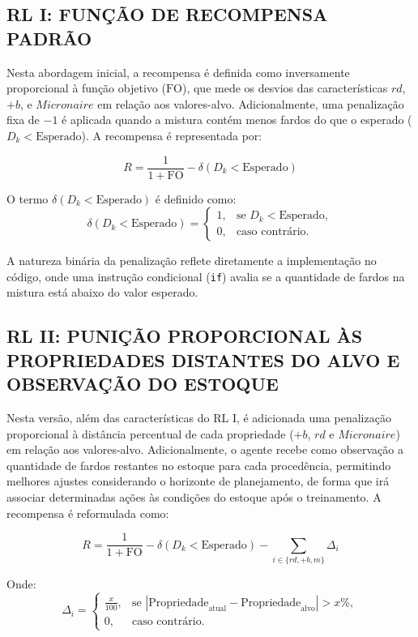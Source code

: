 \documentclass[
    12pt,                %
    openright,           %
    oneside,             %
    a4paper,             %
    english,             %
    spanish,             %
    brazil               %
]{ufscar}
\begin{document}
\subsection{RL I: FUNÇÃO DE RECOMPENSA PADRÃO}

Nesta abordagem inicial, a recompensa é definida como inversamente proporcional à função objetivo (\( \text{FO} \)), que mede os desvios das características \(rd\), \(+b\), e \(Micronaire\) em relação aos valores-alvo. Adicionalmente, uma penalização fixa de \(-1\) é aplicada quando a mistura contém menos fardos do que o esperado (\(D_k < \text{Esperado}\)). A recompensa é representada por:

\begin{equation}
R = \frac{1}{1 + \text{FO}} - \delta(D_k < \text{Esperado})
\end{equation}

O termo \(\delta(D_k < \text{Esperado})\) é definido como:
\[
\delta(D_k < \text{Esperado}) =
\begin{cases} 
1, & \text{se } D_k < \text{Esperado}, \\
0, & \text{caso contrário.}
\end{cases}
\]

A natureza binária da penalização reflete diretamente a implementação no código, onde uma instrução condicional (\texttt{if}) avalia se a quantidade de fardos na mistura está abaixo do valor esperado. 

\subsection{RL II: PUNIÇÃO PROPORCIONAL ÀS PROPRIEDADES DISTANTES DO ALVO E OBSERVAÇÃO DO ESTOQUE}

Nesta versão, além das características do RL I, é adicionada uma penalização proporcional à distância percentual de cada propriedade (\(+b\), \(rd\) e \(Micronaire\)) em relação aos valores-alvo. Adicionalmente, o agente recebe como observação a quantidade de fardos restantes no estoque para cada procedência, permitindo melhores ajustes considerando o horizonte de planejamento, de forma que irá associar determinadas ações às condições do estoque após o treinamento. A recompensa é reformulada como:

\begin{equation}
R = \frac{1}{1 + \text{FO}} - \delta(D_k < \text{Esperado}) - \sum_{i \in \{rd, +b, m\}} \Delta_i
\end{equation}

Onde:
\begin{equation}
\Delta_i =
\begin{cases} 
\frac{x}{100}, & \text{se } \left| \text{Propriedade}_{\text{atual}} - \text{Propriedade}_{\text{alvo}} \right| > x\%, \\
0, & \text{caso contrário.}
\end{cases}
\end{equation}
\end{document}
